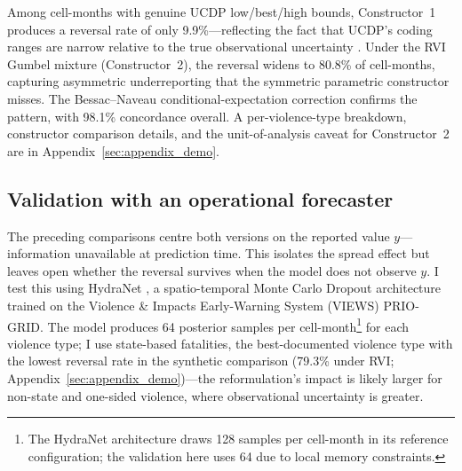 Among cell-months with genuine UCDP low/best/high bounds, Constructor~1 produces a reversal rate of only 9.9\%---reflecting the fact that UCDP's coding ranges are narrow relative to the true observational uncertainty \citep{vesco2026uncertainty}. Under the RVI Gumbel mixture (Constructor~2), the reversal widens to 80.8\% of cell-months, capturing asymmetric underreporting that the symmetric parametric constructor misses. The Bessac--Naveau conditional-expectation correction \citep{bessac2021forecast} confirms the pattern, with 98.1\% concordance overall. A per-violence-type breakdown, constructor comparison details, and the unit-of-analysis caveat for Constructor~2 are in Appendix~\ref{sec:appendix_demo}.

\subsection{Validation with an operational forecaster}

The preceding comparisons centre both versions on the reported value $y$---information unavailable at prediction time. This isolates the spread effect but leaves open whether the reversal survives when the model does not observe $y$. I test this using HydraNet \citep{VonDerMaase2025hydranet}, a spatio-temporal Monte Carlo Dropout architecture trained on the Violence \& Impacts Early-Warning System (VIEWS) PRIO-GRID. The model produces 64 posterior samples per cell-month\footnote{The HydraNet architecture draws 128 samples per cell-month in its reference configuration; the validation here uses 64 due to local memory constraints.} for each violence type; I use state-based fatalities, the best-documented violence type with the lowest reversal rate in the synthetic comparison (79.3\% under RVI; Appendix~\ref{sec:appendix_demo})---the reformulation's impact is likely larger for non-state and one-sided violence, where observational uncertainty is greater.

